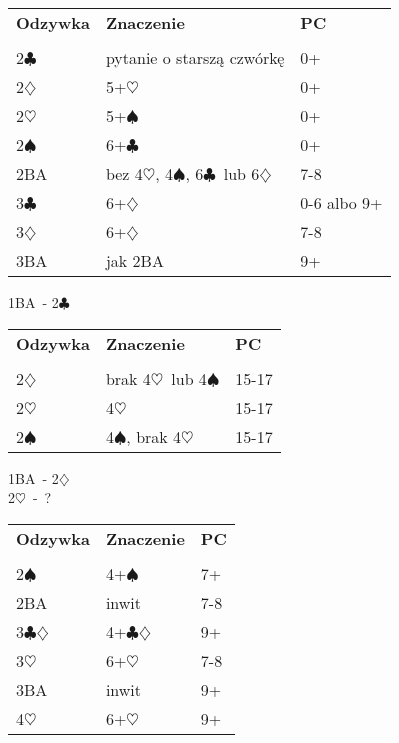 \documentclass{article}
\newlength{\br}
\renewcommand{\c}{\(\clubsuit\)}
\renewcommand{\d}{\(\diamondsuit\)}
\newcommand{\h}{\(\heartsuit\)}
\newcommand{\s}{\(\spadesuit\)}
\begin{document}
\begin{tabular}{p{2cm} p{10cm} l}
	\textbf{Odzywka} & \textbf{Znaczenie} & \textbf{PC}\\\\
	2\c & pytanie o starszą czwórkę & 0+ \\
	2\d\footnote[4] & 5+\h & 0+ \\
	2\h\footnote[4] & 5+\s & 0+ \\
	2\s & 6+\c & 0+ \\
	2BA & bez 4\h, 4\s, 6\c\ lub 6\d & 7-8 \\
	3\c & 6+\d & 0-6 albo 9+ \\
	3\d & 6+\d & 7-8 \\
	3BA & jak 2BA & 9+ \\
\end{tabular}
\begin{center}\LARGE{1BA\ - 2\c}
\end{center}

\begin{tabular}{p{2cm} p{10cm} l}
	\textbf{Odzywka} & \textbf{Znaczenie} & \textbf{PC}\\\\
	2\d & brak 4\h\ lub 4\s & 15-17 \\
	2\h & 4\h & 15-17 \\
	2\s & 4\s, brak 4\h & 15-17
\end{tabular}

\begin{center}\LARGE{1BA\ - 2\d \\ 2\h\ -\ ?}
\end{center}

\begin{tabular}{p{2cm} p{10cm} l}
	\textbf{Odzywka} & \textbf{Znaczenie} & \textbf{PC}\\\\
	2\s\ & 4+\s & 7+ \\
	2BA & inwit & 7-8 \\
	3\c\d & 4+\c\d & 9+ \\
	3\h & 6+\h & 7-8 \\
	3BA & inwit & 9+ \\
	4\h & 6+\h & 9+ \\
\end{tabular}
\end{document}
